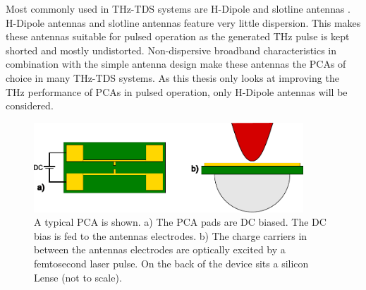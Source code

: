Most commonly used in THz-TDS systems are H-Dipole \cite{nandi1550nmDrivenErAs2018} and slotline antennas \cite{kohlhaasPhotoconductiveTerahertzDetectors2019}. H-Dipole antennas and slotline antennas feature very little dispersion. This makes these antennas suitable for pulsed operation as the generated THz pulse is kept shorted and mostly undistorted. Non-dispersive broadband characteristics in combination with the simple antenna design make these antennas the PCAs of choice in many THz-TDS systems. As this thesis only looks at improving the THz performance of PCAs in pulsed operation, only H-Dipole antennas will be considered. 

\begin{figure}
	\centering
	\includegraphics[width=0.9\textwidth]{figures/typical_PCA.pdf}
	\caption{A typical PCA is shown. a) The PCA pads are DC biased. The DC bias is fed to the antennas electrodes. b) The charge carriers in between the antennas electrodes are optically excited by a femtosecond laser pulse. On the back of the device sits a silicon Lense (not to scale).}
	\label{typPCA}
\end{figure}
